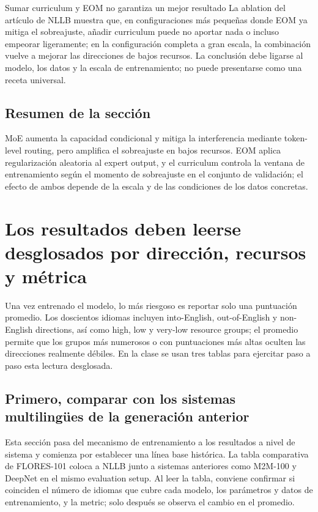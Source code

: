 \documentclass[a4paper]{article}
\begin{document}
\begin{warningbox}{Sumar curriculum y EOM no garantiza un mejor resultado}
La ablation del artículo de NLLB muestra que, en configuraciones más pequeñas donde EOM ya mitiga el sobreajuste, añadir curriculum puede no aportar nada o incluso empeorar ligeramente; en la configuración completa a gran escala, la combinación vuelve a mejorar las direcciones de bajos recursos. La conclusión debe ligarse al modelo, los datos y la escala de entrenamiento; no puede presentarse como una receta universal.
\end{warningbox}

\subsection{Resumen de la sección}

MoE aumenta la capacidad condicional y mitiga la interferencia mediante token-level routing, pero amplifica el sobreajuste en bajos recursos. EOM aplica regularización aleatoria al expert output, y el curriculum controla la ventana de entrenamiento según el momento de sobreajuste en el conjunto de validación; el efecto de ambos depende de la escala y de las condiciones de los datos concretas.
\section{Los resultados deben leerse desglosados por dirección, recursos y métrica}

Una vez entrenado el modelo, lo más riesgoso es reportar solo una puntuación promedio. Los doscientos idiomas incluyen into-English, out-of-English y non-English directions, así como high, low y very-low resource groups; el promedio permite que los grupos más numerosos o con puntuaciones más altas oculten las direcciones realmente débiles. En la clase se usan tres tablas para ejercitar paso a paso esta lectura desglosada.

\subsection{Primero, comparar con los sistemas multilingües de la generación anterior}

Esta sección pasa del mecanismo de entrenamiento a los resultados a nivel de sistema y comienza por establecer una línea base histórica. La tabla comparativa de FLORES-101 coloca a NLLB junto a sistemas anteriores como M2M-100 y DeepNet en el mismo evaluation setup. Al leer la tabla, conviene confirmar si coinciden el número de idiomas que cubre cada modelo, los parámetros y datos de entrenamiento, y la metric; solo después se observa el cambio en el promedio.
\end{document}

